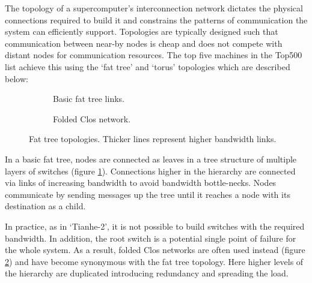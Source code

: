 				
				The topology of a supercomputer's interconnection network dictates the
				physical connections required to build it and constrains the patterns of
				communication the system can efficiently support. Topologies are
				typically designed such that communication between near-by nodes is
				cheap and does not compete with distant nodes for communication
				resources. The top five machines in the Top500 list achieve this using
				the `fat tree' and `torus' topologies which are described below:
				
				\begin{figure}
					\begin{subfigure}[t]{\textwidth}
						\center
						
						\caption{Basic fat tree links.}
						\label{fig:fat-tree-concept}
					\end{subfigure}
					
					\vspace{1.5em}
					
					\begin{subfigure}[t]{\textwidth}
						\center
						
						\caption{Folded Clos network.}
						\label{fig:fat-tree-closs}
					\end{subfigure}
					
					\caption[Fat tree topologies.]{Fat tree topologies. Thicker lines
					represent higher bandwidth links.}
					\label{fig:fat-tree}
				\end{figure}
				
				\label{sec:fat-tree}
				
				In a basic fat tree, nodes are connected as leaves in a tree structure
				of multiple layers of switches (figure \ref{fig:fat-tree-concept}).
				Connections higher in the hierarchy are connected via links of
				increasing bandwidth to avoid bandwidth bottle-necks.  Nodes communicate
				by sending messages up the tree until it reaches a node with its
				destination as a child.
				
				In practice, as in `Tianhe-2', it is not possible to build switches with
				the required bandwidth. In addition, the root switch is a potential
				single point of failure for the whole system. As a result, folded Clos
				networks are often used instead (figure \ref{fig:fat-tree-closs}) and
				have become synonymous with the fat tree topology. Here higher levels of
				the hierarchy are duplicated introducing redundancy and spreading the
				load.
				
